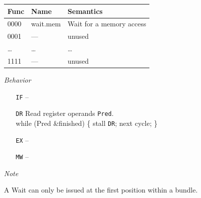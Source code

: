 \documentclass{IEEEtran}
\newcommand{\AND}{\&\xspace}
\newcommand{\NOT}{\texttildelow}
\begin{document}
\begin{tabular}{lll}
  Func & Name     & Semantics \\ \hline
  0000 & wait.mem & Wait for a memory access \\
  0001 & ---    & unused \\
  \dots& \dots  & \dots \\
  1111 & ---    & unused \\ \hline
\end{tabular}

\vspace{7mm}
\emph{Behavior}
\begin{itemize}
  \item[\texttt{IF}] --
  \item[\texttt{DR}] Read register operands \texttt{Pred}.\\
                     while (\NOT Pred \AND \NOT finished) \{ stall \texttt{DR}; next cycle; \}
  \item[\texttt{EX}] --
  \item[\texttt{MW}] --
\end{itemize}

\vspace{7mm}
\emph{Note}

A Wait can only be issued at the first position within a bundle.


\vspace{5mm}
\end{document}
